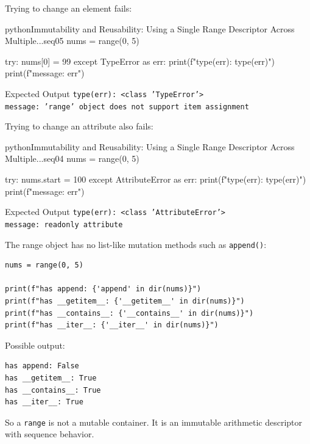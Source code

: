 \documentclass[a4paper,twoside]{report}
\begin{document}
Trying to change an element fails:

\begin{codebox}[]{python}{Immutability and Reusability: Using a Single Range Descriptor Across Multiple...}{seq05}
nums = range(0, 5)

try:
    nums[0] = 99
except TypeError as err:
    print(f"type(err): {type(err)}")
    print(f"message: {err}")
\end{codebox}


\begin{iobox}{Expected Output}
\texttt{type(err): <class 'TypeError'>} \\
\texttt{message: 'range' object does not support item assignment} \\
\end{iobox}


Trying to change an attribute also fails:

\begin{codebox}[]{python}{Immutability and Reusability: Using a Single Range Descriptor Across Multiple...}{seq04}
nums = range(0, 5)

try:
    nums.start = 100
except AttributeError as err:
    print(f"type(err): {type(err)}")
    print(f"message: {err}")
\end{codebox}


\begin{iobox}{Expected Output}
\texttt{type(err): <class 'AttributeError'>} \\
\texttt{message: readonly attribute} \\
\end{iobox}


The range object has no list-like mutation methods such as \texttt{append()}:

\begin{verbatim}
nums = range(0, 5)

print(f"has append: {'append' in dir(nums)}")
print(f"has __getitem__: {'__getitem__' in dir(nums)}")
print(f"has __contains__: {'__contains__' in dir(nums)}")
print(f"has __iter__: {'__iter__' in dir(nums)}")
\end{verbatim}

Possible output:

\begin{verbatim}
has append: False
has __getitem__: True
has __contains__: True
has __iter__: True
\end{verbatim}

So a \texttt{range} is not a mutable container. It is an immutable arithmetic descriptor with sequence behavior.
\end{document}
